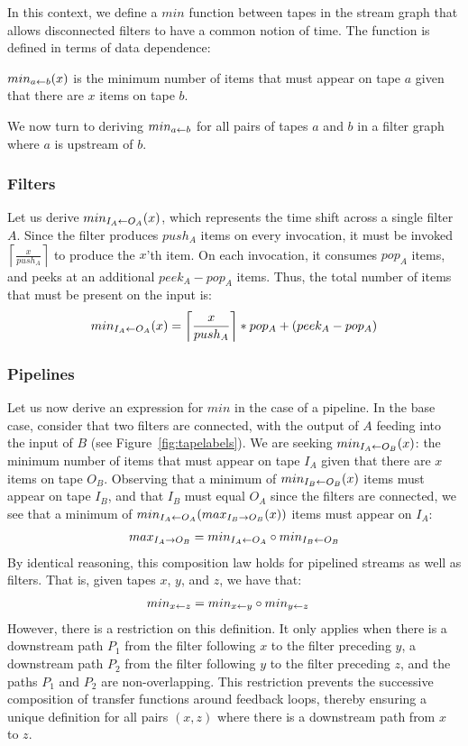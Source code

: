 In this context, we define a $min$ function between tapes in the
stream graph that allows disconnected filters to have a common notion
of time.  The function is defined in terms of data dependence:
\begin{definition}
$min_{a \leftarrow b}(x)$ is the minimum number of items that must appear on tape
$a$ given that there are $x$ items on tape $b$.
\end{definition}

We now turn to deriving $min_{a \leftarrow b}$ for all pairs of tapes $a$ and $b$
in a filter graph where $a$ is upstream of $b$.

\subsubsection{Filters}

Let us derive $min_{I_A \leftarrow O_A}(x)$, which represents the time shift
across a single filter $A$.  Since the filter produces $push_A$ items
on every invocation, it must be invoked
$\left\lceil\frac{x}{push_A}\right\rceil$ to produce the $x$'th item.
On each invocation, it consumes $pop_A$ items, and peeks at an
additional $peek_A-pop_A$ items.  Thus, the total number of items that
must be present on the input is:
\begin{align*}
min_{I_A \leftarrow O_A}(x) = \left\lceil\frac{x}{push_A}\right\rceil*pop_A+(peek_A-pop_A)
\end{align*}

\subsubsection{Pipelines}

Let us now derive an expression for $min$ in the case of a pipeline.
In the base case, consider that two filters are connected, with the
output of $A$ feeding into the input of $B$ (see
Figure~\ref{fig:tapelabels}).  We are seeking $min_{I_A \leftarrow O_B}(x)$: the
minimum number of items that must appear on tape $I_A$ given that
there are $x$ items on tape $O_B$.  Observing that a minimum of
$min_{I_B \leftarrow O_B}(x)$ items must appear on tape $I_B$, and that $I_B$
must equal $O_A$ since the filters are connected, we see that a
minimum of $min_{I_A \leftarrow O_A}(max_{I_B \rightarrow O_B}(x))$ items must appear on
$I_A$:
\begin{align*}
max_{I_A \rightarrow O_B} = min_{I_A \leftarrow O_A} \circ min_{I_B \leftarrow O_B}
\end{align*}
By identical reasoning, this composition law holds for pipelined
streams as well as filters.  That is, given tapes $x$, $y$, and $z$,
we have that:
\begin{align}
\label{eq:compose}
min_{x \leftarrow z} &= min_{x \leftarrow y} \circ min_{y \leftarrow z}
\end{align}
However, there is a restriction on this definition.  It only applies
when there is a downstream path $P_1$ from the filter following $x$ to
the filter preceding $y$, a downstream path $P_2$ from the filter
following $y$ to the filter preceding $z$, and the paths $P_1$ and
$P_2$ are non-overlapping.  This restriction prevents the successive
composition of transfer functions around feedback loops, thereby
ensuring a unique definition for all pairs $(x, z)$ where there is a
downstream path from $x$ to $z$.

